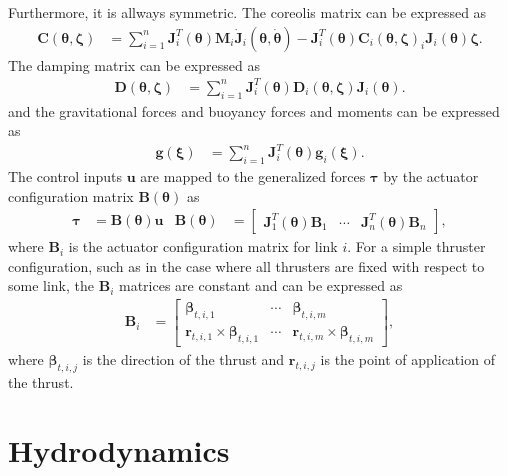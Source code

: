 Furthermore, it is allways symmetric. The coreolis matrix can be expressed as
\begin{align}
    \bm{C}(\bm{\theta}, \bm{\zeta}) &=
    \sum_{i=1}^{n} \bm{J}_{i}^T(\bm{\theta}) \bm{M}_i \dot{\bm{J}}_{i}(\bm{\theta},\dot{\bm{\theta}})
    -\bm{J}_{i}^T(\bm{\theta}) \bm{C}_i(\bm{\theta},\bm{\zeta})_i \bm{J}_{i}(\bm{\theta}) \bm{\zeta}.
\end{align}
The damping matrix can be expressed as
\begin{align}
    \bm{D}(\bm{\theta}, \bm{\zeta}) &=
    \sum_{i=1}^{n} \bm{J}_{i}^T(\bm{\theta}) \bm{D}_i(\bm{\theta},\bm{\zeta}) \bm{J}_{i}(\bm{\theta}).
\end{align}
and the gravitational forces and buoyancy forces and moments can be expressed as
\begin{align}
    \bm{g}(\bm{\xi}) &=
    \sum_{i=1}^{n} \bm{J}_{i}^T(\bm{\theta}) \bm{g}_i(\bm{\xi}).
\end{align}
The control inputs $\bm{u}$ are mapped to the generalized forces $\bm{\tau}$ by
the actuator configuration matrix $\bm{B}(\bm{\theta})$ as
\begin{align}
    \bm{\tau} &= \bm{B}(\bm{\theta}) \bm{u} &
    \bm{B}(\bm{\theta}) &= \begin{bmatrix}
        \bm{J}_1^T(\bm{\theta}) \bm{B}_1 & \cdots & \bm{J}_n^T(\bm{\theta}) \bm{B}_n
    \end{bmatrix},
\end{align}
where $\bm{B}_i$ is the actuator configuration matrix for link $i$. For a simple
thruster configuration, such as in the case where all thrusters are fixed with
respect to some link, the $\bm{B}_i$ matrices are constant and can be expressed
as
\begin{align}
    \bm{B}_i &= \begin{bmatrix}
        \bm{\beta}_{t,i,1} & \cdots & \bm{\beta}_{t,i,m} \\
        \bm{r}_{t,i,1} \times \bm{\beta}_{t,i,1} & \cdots & \bm{r}_{t,i,m} \times \bm{\beta}_{t,i,m}
    \end{bmatrix},
\end{align}
where $\bm{\beta}_{t,i,j}$ is the direction of the thrust and $\bm{r}_{t,i,j}$
is the point of application of the thrust.





\section{Hydrodynamics}
\label{sec:hydrodynamics}


